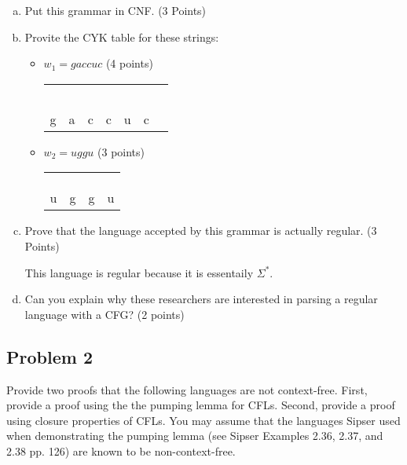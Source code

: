 \documentclass{article}
\begin{document}
\begin{enumerate}[(a)]
\item Put this grammar in CNF. (3 Points)
\item Provite the CYK table for these strings:
    \begin{itemize}
        \item $w_1=gaccuc$ (4 points)

        \begin{tabular}{|c|c|c|c|c|c|c|}
        \hline
        & & & & & \\
        \hline
        & & & & & \\
        \hline
        & & & & & \\
        \hline
        & & & & & \\
        \hline
        & & & & & \\
        \hline
        & & & & & \\
        \hline
        g&a&c&c&u&c\\
        \hline
        \end{tabular}
        \item $w_2=uggu$ (3 points)

        \begin{tabular}{|c|c|c|c|}
        \hline
        & & & \\
        \hline
        & & & \\
        \hline
        & & & \\
        \hline
        & & & \\
        \hline
        u&g&g&u\\
        \hline
        \end{tabular}

    \end{itemize}

\item Prove that the language accepted by this grammar is actually regular. (3 Points)

This language is regular because it is essentaily $\Sigma^*$.

\item Can you explain why these researchers are interested in parsing a regular language with
a CFG? (2 points)
\end{enumerate}

\newpage
\subsection*{Problem 2}
Provide two proofs that the following languages are not context-free. First, provide a proof
using the the pumping lemma for CFLs. Second, provide a proof using closure properties of
CFLs. You may assume that the languages Sipser used when demonstrating the pumping lemma
(see Sipser Examples 2.36, 2.37, and 2.38 pp. 126) are known to be non-context-free.
\end{document}
